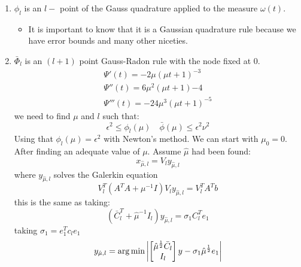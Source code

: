 \begin{teorema}
\begin{enumerate}[1)]
\item $\phi_l$ is an $l-$ point of the Gauss quadrature applied to the measure $\omega(t)$.
\begin{itemize}
\item It is important to know that it is a Gaussian quadrature rule because we have error bounds and many other niceties.
\end{itemize}
\item $\bar \Phi_l$ is an $(l+1)$ point Gauss-Radon rule with the node fixed at 0.
\begin{gather*}
\Psi'(t) = -2\mu (\mu t + 1)^{-3} \\
\Psi''(t) = 6 \mu^2 (\mu t + 1){-4} \\
\Psi'''(t) = -24\mu^3 (\mu t + 1)^{-5}
\end{gather*}
we need to find $\mu$ and $l$ such that:
$$\epsilon^2 \leq \phi_l(\mu) \quad \bar \phi(\mu) \leq \epsilon^2 \nu^2$$
Using that $\phi_l(\mu) = \epsilon^2$ with Newton's method. We can start with $\mu_0 =0$. After finding an adequate value of $\mu$. Assume $\hat \mu$ had been found:
$$x_{\hat \mu,l} = V_l y_{\hat \mu, l}$$
where $y_{\hat \mu,l}$ solves the Galerkin equation
$$V^T_l (A^TA + \mu^{-1} I ) V_l y_{\hat \mu,l} = V^T_l A^T b$$
this is the same as taking:
$$(\bar C_l^T + \hat \mu^{-1} I_l) y_{\hat \mu,l} = \sigma_1 C_l^T e_1$$
taking $\sigma_1 = e_1^T c_l e_1$
$$y_{\hat \mu,l} = \operatorname*{arg\,min} \left| \begin{bmatrix} \hat \mu^{\frac 12} \bar C_l \\ I_l\end{bmatrix} y - \sigma_1 \hat \mu^{\frac 12} e_1 \right|$$
\end{enumerate}
\end{teorema}
